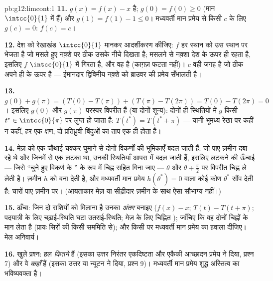 \begin{solution}{pb:g12:limcont:1}
\textbf{11.} $g(x) = f(x) - x$  है; $g(0) = f(0) \geq 0$ (मान $\intcc{0}{1}$ में हैं) और $g(1) = f(1) - 1 \leq 0$। मध्यवर्ती मान
प्रमेय से किसी $c$ के लिए $g(c) = 0$: $f(c) = c$।

\textbf{12.} देश को रेखाखंड $\intcc{0}{1}$ मानकर आदर्शीकरण कीजिए: $f$ हर स्थान को उस
स्थान पर भेजता है जो मसले हुए नक़्शे पर ठीक उसके नीचे दिखता है; मसलने से नक़्शा
देश के ऊपर ही रहता है, इसलिए $f$ $\intcc{0}{1}$ में गिरता है, और वह  है (काग़ज़
फटता नहीं)।  $c$ वही जगह है जो ठीक अपने ही  के ऊपर है
--- ईमानदार द्विविमीय नक़्शे को ब्राउवर की प्रमेय सँभालती है।

\textbf{13.} $g(0) + g(\pi) = \left(T(0) - T(\pi)\right) +
\left(T(\pi) - T(2\pi)\right) = T(0) - T(2\pi) = 0$। इसलिए $g(0)$ और $g(\pi)$ परस्पर विपरीत हैं (या दोनों शून्य):
दोनों ही स्थितियों में  $g$ किसी $t^* \in \intcc{0}{\pi}$ पर लुप्त हो जाता है: $T(t^*) = T(t^* + \pi)$ ---
यानी भूमध्य रेखा पर कहीं न कहीं, हर एक क्षण, दो प्रतिध्रुवी बिंदुओं का ताप
एक ही होता है।

\textbf{14.} मेज़ को एक चौथाई चक्कर घुमाने से दोनों विकर्णों की भूमिकाएँ बदल
जाती हैं: जो पाए ज़मीन दबा रहे थे और जिनमें से एक लटका था, उनकी स्थितियाँ आपस
में बदल जाती हैं, इसलिए लटकने की ऊँचाई --- जिसे ``चुने हुए विकर्ण के ''
के रूप में चिह्न सहित गिना जाए --- $\theta$ और $\theta + \frac\pi2$ पर विपरीत चिह्न ले लेती है।
 ज़मीन $h$ को  बना देती है, और मध्यवर्ती मान प्रमेय $h(\theta^*) = 0$ वाला कोई
कोण $\theta^*$ सौंप देती है: चारों पाए ज़मीन पर। (आयताकार मेज़ या सीढ़ीदार ज़मीन के
साथ ऐसा सौभाग्य नहीं।)

\textbf{15.} ढाँचा: जिन दो राशियों को मिलाना है उनका \emph{अंतर} बनाइए ($f(x) - x$;
$T(t) - T(t + \pi)$; पदयात्री के लिए चढ़ाई-स्थिति घटा उतराई-स्थिति; मेज़ के लिए चिह्नित
); जाँचिए कि वह दोनों चिह्नों के मान लेता है (प्रायः सिरों की किसी
सममिति से); और किसी   पर मध्यवर्ती मान प्रमेय का हवाला दीजिए। मेल
अनिवार्य।

\textbf{16.} खुले प्रश्न: हल \emph{कितने} हैं (इसका उत्तर निरंतर एकदिष्टता और
एकैकी आच्छादन प्रमेय ने दिया, प्रश्न 7) और वे \emph{कहाँ} हैं (इसका उत्तर
 या न्यूटन ने दिया, प्रश्न 9)। मध्यवर्ती मान प्रमेय शुद्ध अस्तित्व का
भविष्यवक्ता है।


\end{solution}
